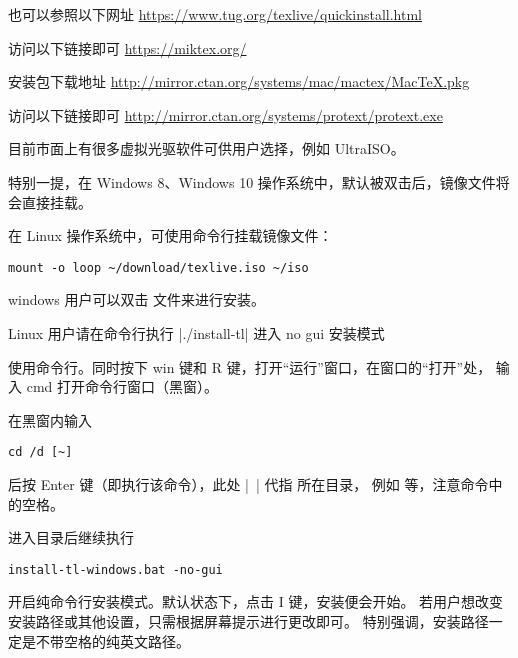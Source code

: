 也可以参照以下网址 \url{https://www.tug.org/texlive/quickinstall.html}


访问以下链接即可 \url{https://miktex.org/}


\MacTeX{} 安装包下载地址 \url{http://mirror.ctan.org/systems/mac/mactex/MacTeX.pkg}



访问以下链接即可 \url{http://mirror.ctan.org/systems/protext/protext.exe}



目前市面上有很多虚拟光驱软件可供用户选择，例如 UltraISO。

特别一提，在 Windows 8、Windows 10
操作系统中，默认被双击后，镜像文件将会直接挂载。

在 Linux 操作系统中，可使用命令行挂载镜像文件：
\begin{verbatim}
mount -o loop ~/download/texlive.iso ~/iso
\end{verbatim}



windows 用户可以双击  文件来进行安装。

Linux 用户请在命令行执行 |./install-tl| 进入 no gui 安装模式



使用命令行。同时按下 win 键和 R 键，打开“运行”窗口，在窗口的“打开”处，
输入 cmd 打开命令行窗口（黑窗）。

在黑窗内输入
\begin{verbatim}
cd /d [~]
\end{verbatim}

后按 Enter 键（即执行该命令），此处 |~| 代指  所在目录，
例如  等，注意命令中的空格。

进入目录后继续执行
\begin{verbatim}
install-tl-windows.bat -no-gui
\end{verbatim}

开启纯命令行安装模式。默认状态下，点击 I 键，安装便会开始。
若用户想改变安装路径或其他设置，只需根据屏幕提示进行更改即可。
特别强调，安装路径一定是不带空格的纯英文路径。



